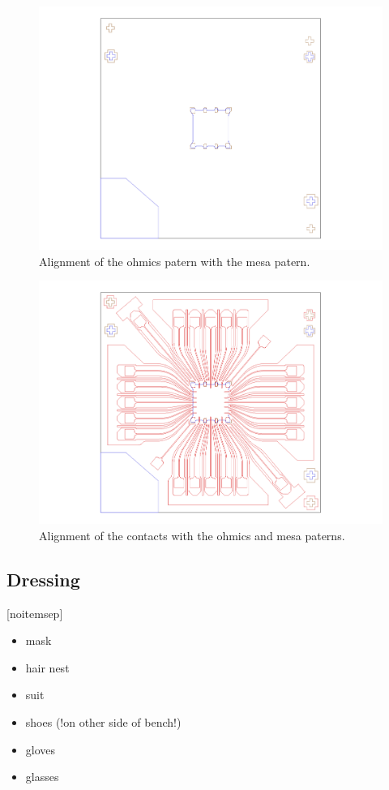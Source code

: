 \begin{figure} [h] \centering
\includegraphics[scale=0.3]{fig/align1_1.pdf}
\caption{Alignment of the ohmics patern with the mesa patern.} \label{align1}
\end{figure}

\begin{figure} [h] \centering
\includegraphics[scale=0.3]{fig/align2_1.pdf}
\caption{Alignment of the contacts with the ohmics and mesa paterns.} \label{align2}
\end{figure}



\newpage

\subsection{Dressing}[noitemsep]
\begin{itemize}
\item mask
\item hair nest
\item suit
\item shoes (!on other side of bench!)
\item gloves
\item glasses
\end{itemize}

